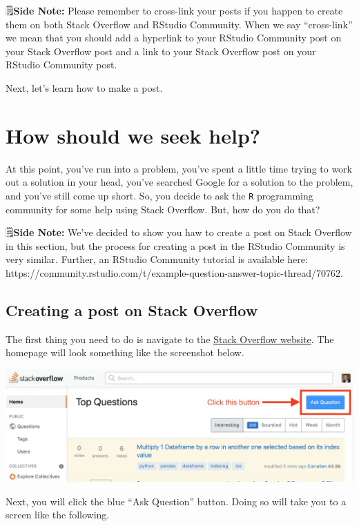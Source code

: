 \documentclass[
  letterpaper,
  DIV=11,
  numbers=noendperiod]{scrreprt}
\begin{document}
🗒\textbf{Side Note:} Please remember to cross-link your posts if you
happen to create them on both Stack Overflow and RStudio Community. When
we say ``cross-link'' we mean that you should add a hyperlink to your
RStudio Community post on your Stack Overflow post and a link to your
Stack Overflow post on your RStudio Community post.

Next, let's learn how to make a post.

\section{How should we seek help?}\label{how-should-we-seek-help}

At this point, you've run into a problem, you've spent a little time
trying to work out a solution in your head, you've searched Google for a
solution to the problem, and you've still come up short. So, you decide
to ask the \texttt{R} programming community for some help using Stack
Overflow. But, how do you do that?

🗒\textbf{Side Note:} We've decided to show you haw to create a post on
Stack Overflow in this section, but the process for creating a post in
the RStudio Community is very similar. Further, an RStudio Community
tutorial is available here:
https://community.rstudio.com/t/example-question-answer-topic-thread/70762.

\subsection{Creating a post on Stack
Overflow}\label{creating-a-post-on-stack-overflow}

The first thing you need to do is navigate to the
\href{https://stackoverflow.com/}{Stack Overflow website}. The homepage
will look something like the screenshot below.

\includegraphics{chapters/asking_questions/so_1.png}

Next, you will click the blue ``Ask Question'' button. Doing so will
take you to a screen like the following.
\end{document}
